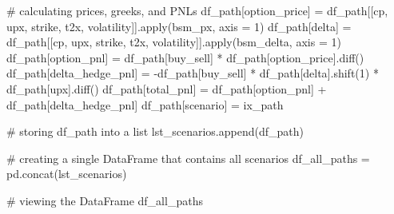 \documentclass[
  letterpaper,
  DIV=11,
  numbers=noendperiod]{scrreprt}
\newenvironment{Shaded}{\begin{snugshade}}{\end{snugshade}}
\newcommand{\BuiltInTok}[1]{\textcolor[rgb]{0.00,0.23,0.31}{#1}}
\newcommand{\CommentTok}[1]{\textcolor[rgb]{0.37,0.37,0.37}{#1}}
\newcommand{\DecValTok}[1]{\textcolor[rgb]{0.68,0.00,0.00}{#1}}
\newcommand{\NormalTok}[1]{\textcolor[rgb]{0.00,0.23,0.31}{#1}}
\newcommand{\OperatorTok}[1]{\textcolor[rgb]{0.37,0.37,0.37}{#1}}
\newcommand{\StringTok}[1]{\textcolor[rgb]{0.13,0.47,0.30}{#1}}
\begin{document}
\begin{Shaded}
\begin{Highlighting}[]
    \CommentTok{\# calculating prices, greeks, and PNLs}
\NormalTok{    df\_path[}\StringTok{\textquotesingle{}option\_price\textquotesingle{}}\NormalTok{] }\OperatorTok{=}\NormalTok{ df\_path[[}\StringTok{\textquotesingle{}cp\textquotesingle{}}\NormalTok{, }\StringTok{\textquotesingle{}upx\textquotesingle{}}\NormalTok{, }\StringTok{\textquotesingle{}strike\textquotesingle{}}\NormalTok{, }\StringTok{\textquotesingle{}t2x\textquotesingle{}}\NormalTok{, }\StringTok{\textquotesingle{}volatility\textquotesingle{}}\NormalTok{]].}\BuiltInTok{apply}\NormalTok{(bsm\_px, axis }\OperatorTok{=} \DecValTok{1}\NormalTok{)}
\NormalTok{    df\_path[}\StringTok{\textquotesingle{}delta\textquotesingle{}}\NormalTok{] }\OperatorTok{=}\NormalTok{ df\_path[[}\StringTok{\textquotesingle{}cp\textquotesingle{}}\NormalTok{, }\StringTok{\textquotesingle{}upx\textquotesingle{}}\NormalTok{, }\StringTok{\textquotesingle{}strike\textquotesingle{}}\NormalTok{, }\StringTok{\textquotesingle{}t2x\textquotesingle{}}\NormalTok{, }\StringTok{\textquotesingle{}volatility\textquotesingle{}}\NormalTok{]].}\BuiltInTok{apply}\NormalTok{(bsm\_delta, axis }\OperatorTok{=} \DecValTok{1}\NormalTok{)}
\NormalTok{    df\_path[}\StringTok{\textquotesingle{}option\_pnl\textquotesingle{}}\NormalTok{] }\OperatorTok{=}\NormalTok{ df\_path[}\StringTok{\textquotesingle{}buy\_sell\textquotesingle{}}\NormalTok{] }\OperatorTok{*}\NormalTok{ df\_path[}\StringTok{\textquotesingle{}option\_price\textquotesingle{}}\NormalTok{].diff()}
\NormalTok{    df\_path[}\StringTok{\textquotesingle{}delta\_hedge\_pnl\textquotesingle{}}\NormalTok{] }\OperatorTok{=} \OperatorTok{{-}}\NormalTok{df\_path[}\StringTok{\textquotesingle{}buy\_sell\textquotesingle{}}\NormalTok{] }\OperatorTok{*}\NormalTok{ df\_path[}\StringTok{\textquotesingle{}delta\textquotesingle{}}\NormalTok{].shift(}\DecValTok{1}\NormalTok{) }\OperatorTok{*}\NormalTok{ df\_path[}\StringTok{\textquotesingle{}upx\textquotesingle{}}\NormalTok{].diff()}
\NormalTok{    df\_path[}\StringTok{\textquotesingle{}total\_pnl\textquotesingle{}}\NormalTok{] }\OperatorTok{=}\NormalTok{ df\_path[}\StringTok{\textquotesingle{}option\_pnl\textquotesingle{}}\NormalTok{] }\OperatorTok{+}\NormalTok{ df\_path[}\StringTok{\textquotesingle{}delta\_hedge\_pnl\textquotesingle{}}\NormalTok{]}
\NormalTok{    df\_path[}\StringTok{\textquotesingle{}scenario\textquotesingle{}}\NormalTok{] }\OperatorTok{=}\NormalTok{ ix\_path}
    
    \CommentTok{\# storing df\_path into a list}
\NormalTok{    lst\_scenarios.append(df\_path)}

\CommentTok{\# creating a single DataFrame that contains all scenarios}
\NormalTok{df\_all\_paths }\OperatorTok{=}\NormalTok{ pd.concat(lst\_scenarios)}

\CommentTok{\# viewing the DataFrame}
\NormalTok{df\_all\_paths}
\end{Highlighting}
\end{Shaded}
\end{document}
